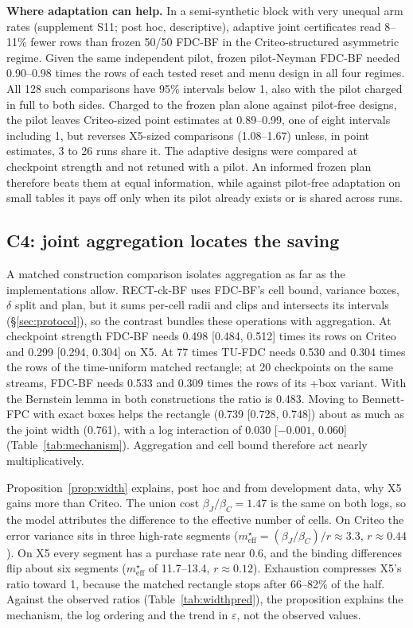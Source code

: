 \documentclass[sigconf,anonymous,review]{acmart}
\newcommand{\eps}{\varepsilon}
\newcommand{\meff}{m_{\text{eff}}}
\begin{document}
\textbf{Where adaptation can help.} In a semi-synthetic block with very unequal arm rates (supplement S11; post hoc, descriptive), adaptive joint certificates read 8--11\% fewer rows than frozen 50/50 FDC-BF in the Criteo-structured asymmetric regime. Given the same independent pilot, frozen pilot-Neyman FDC-BF needed 0.90--0.98 times the rows of each tested reset and menu design in all four regimes. All 128 such comparisons have 95\% intervals below 1, also with the pilot charged in full to both sides. Charged to the frozen plan alone against pilot-free designs, the pilot leaves Criteo-sized point estimates at 0.89--0.99, one of eight intervals including 1, but reverses X5-sized comparisons (1.08--1.67) unless, in point estimates, 3 to 26 runs share it. The adaptive designs were compared at checkpoint strength and not retuned with a pilot. An informed frozen plan therefore beats them at equal information, while against pilot-free adaptation on small tables it pays off only when its pilot already exists or is shared across runs.

\subsection{C4: joint aggregation locates the saving}\label{sec:c4}

A matched construction comparison isolates aggregation as far as the implementations allow. RECT-ck-BF uses FDC-BF's cell bound, variance boxes, $\delta$ split and plan, but it sums per-cell radii and clips and intersects its intervals (\S\ref{sec:protocol}), so the contrast bundles these operations with aggregation. At checkpoint strength FDC-BF needs 0.498 [0.484, 0.512] times its rows on Criteo and 0.299 [0.294, 0.304] on X5. At 77 times TU-FDC needs 0.530 and 0.304 times the rows of the time-uniform matched rectangle; at 20 checkpoints on the same streams, FDC-BF needs 0.533 and 0.309 times the rows of its +box variant. With the Bernstein lemma in both constructions the ratio is 0.483. Moving to Bennett-FPC with exact boxes helps the rectangle (0.739 [0.728, 0.748]) about as much as the joint width (0.761), with a log interaction of 0.030 [$-0.001$, 0.060] (Table~\ref{tab:mechanism}). Aggregation and cell bound therefore act nearly multiplicatively.

Proposition~\ref{prop:width} explains, post hoc and from development data, why X5 gains more than Criteo. The union cost $\beta_J/\beta_C = 1.47$ is the same on both logs, so the model attributes the difference to the effective number of cells. On Criteo the error variance sits in three high-rate segments ($\meff^\star = (\beta_J/\beta_C)/r \approx 3.3$, $r \approx 0.44$). On X5 every segment has a purchase rate near 0.6, and the binding differences flip about six segments ($\meff^\star$ of 11.7--13.4, $r \approx 0.12$). Exhaustion compresses X5's ratio toward 1, because the matched rectangle stops after 66--82\% of the half. Against the observed ratios (Table~\ref{tab:widthpred}), the proposition explains the mechanism, the log ordering and the trend in $\eps$, not the observed values.
\end{document}
